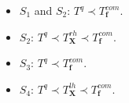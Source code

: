 \documentclass[12pt,a4paper,twoside]{article}
\begin{document}
\begin{itemize}
\item $S_1$ and $S_2$: $T^q \prec T^{com}_{\bm f}$.
\item $S_2$: $T^q \prec T^{rh}_{\bm X} \prec T^{com}_{\bm f} $.
\item $S_3$: $T^q \prec T^{com}_{\bm f} $.
\item $S_4$: $T^q \prec T^{lh}_{\bm X}  \prec T^{com}_{\bm f} $.
\end{itemize}



\end{document}
